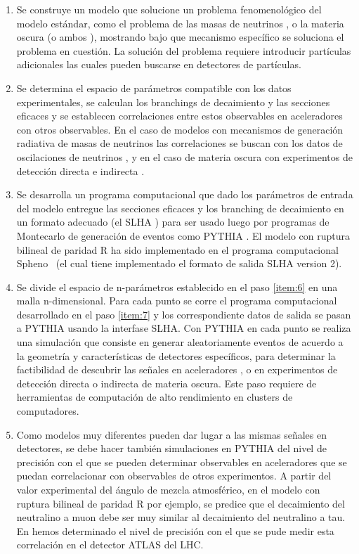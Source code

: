 \begin{enumerate}
\item Se construye un modelo que solucione un problema fenomenológico
  del modelo estándar, como el problema de las masas de neutrinos
  \cite{Hirsch:2000ef}, o la materia oscura (o ambos
  \cite{Hirsch:2005ag}), mostrando bajo que mecanismo específico se
  soluciona el problema en cuestión. La solución del problema requiere
  introducir partículas adicionales las cuales pueden buscarse en
  detectores de partículas.
  \label{item:5}
\item Se determina el espacio de parámetros compatible con los datos
  experimentales, se calculan los branchings de decaimiento y las
  secciones eficaces y se establecen correlaciones entre estos
  observables en aceleradores con otros observables. En el caso de
  modelos con mecanismos de generación radiativa de masas de neutrinos
  las correlaciones se buscan con los datos de oscilaciones de
  neutrinos \cite{Diaz:2003as}, y en el caso de materia oscura con
  experimentos de detección directa e indirecta \cite{Choi:2010xn}.
  \label{item:6}
\item Se desarrolla un programa computacional que dado los parámetros
  de entrada del modelo entregue las secciones eficaces y los
  branching de decaimiento en un formato adecuado (el SLHA
  \cite{0801.0045}) para ser usado luego por programas de Montecarlo
  de generación de eventos como PYTHIA \cite{hep-ph/0603175}. El
  modelo con ruptura bilineal de paridad R ha sido implementado en el
  programa computacional Spheno~\cite{Porod:2003um} (el cual tiene
  implementado el formato de salida SLHA version 2).
  \label{item:7}
\item Se divide el espacio de n-parámetros establecido en el paso
  \ref{item:6} en una malla n-dimensional. Para cada punto se corre el
  programa computacional desarrollado en el paso \ref{item:7} y los
  correspondiente datos de salida se pasan a PYTHIA usando la
  interfase SLHA. Con PYTHIA en cada punto se realiza una simulación
  que consiste en generar aleatoriamente eventos de acuerdo a la
  geometría y características de detectores específicos, para
  determinar la factibilidad de descubrir las señales en aceleradores
  \cite{Magro:2003zb,deCampos:2005ri,deCampos:2007bn,deCampos:2008ic,deCampos:2008re},
  o en experimentos de detección directa o indirecta
  \cite{Choi:2010xn} de materia oscura. Este paso requiere de
  herramientas de computación de alto rendimiento en clusters de
  computadores.
  \label{item:8}
\item Como modelos muy diferentes pueden dar lugar a las mismas
  señales en detectores, se debe hacer también simulaciones en PYTHIA
  del nivel de precisión con el que se pueden determinar observables
  en aceleradores que se puedan correlacionar con observables de otros
  experimentos. A partir del valor experimental del ángulo de mezcla
  atmosférico, en el modelo con ruptura bilineal de paridad R por
  ejemplo, se predice que el decaimiento del neutralino a muon debe
  ser muy similar al decaimiento del neutralino a tau. En
  \cite{DeCampos:2010yu} hemos determinado el nivel de precisión con
  el que se pude medir esta correlación en el detector ATLAS del LHC.
  \label{item:9}
\end{enumerate}
